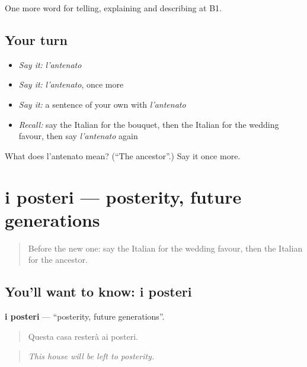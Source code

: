 \begin{grammarlens}[title={What you've built}]
One more word for telling, explaining and describing at B1.
\end{grammarlens}

\subsection*{Your turn}
\begin{itemize}
\raggedright
  \item \emph{Say it:} \emph{l'antenato}
  \item \emph{Say it:} \emph{l'antenato}, once more
  \item \emph{Say it:} a sentence of your own with \emph{l'antenato}
  \item \emph{Recall:} say the Italian for the bouquet, then the Italian for the wedding favour, then say \emph{l'antenato} again
\end{itemize}

\begin{tcolorbox}[breakable,colback=teal!4,colframe=teal!35!black,title={Before you move on}]
What does l'antenato mean? (\textquotedblleft{}The ancestor\textquotedblright{}.) Say it once more.
\end{tcolorbox}
\section[i posteri]{i posteri — posterity, future generations}

\label{lesson:IT-C312-posteri}



\begin{quote}
Before the new one: say the Italian for the wedding favour, then the Italian for the ancestor.
\end{quote}

\subsection*{You'll want to know: i posteri}
\textbf{i posteri} — \textquotedblleft{}posterity, future generations\textquotedblright{}.

\begin{quote}
Questa casa resterà ai posteri.
\end{quote}

\begin{quote}
\emph{This house will be left to posterity.}
\end{quote}

